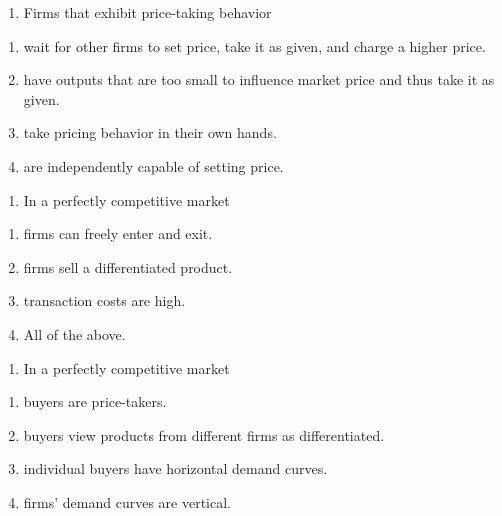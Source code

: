 \documentclass[11pt,]{article}
\providecommand{\tightlist}{%
  \setlength{\itemsep}{0pt}\setlength{\parskip}{0pt}}
\begin{document}
\begin{enumerate}
\def\labelenumi{\arabic{enumi})}
\setcounter{enumi}{11}
\tightlist
\item
  Firms that exhibit price-taking behavior
\end{enumerate}

\begin{enumerate}
\def\labelenumi{\Alph{enumi})}
\tightlist
\item
  wait for other firms to set price, take it as given, and charge a
  higher price.
\item
  have outputs that are too small to influence market price and thus
  take it as given.
\item
  take pricing behavior in their own hands.
\item
  are independently capable of setting price.
\end{enumerate}

\begin{enumerate}
\def\labelenumi{\arabic{enumi})}
\setcounter{enumi}{12}
\tightlist
\item
  In a perfectly competitive market
\end{enumerate}

\begin{enumerate}
\def\labelenumi{\Alph{enumi})}
\tightlist
\item
  firms can freely enter and exit.
\item
  firms sell a differentiated product.
\item
  transaction costs are high.
\item
  All of the above.
\end{enumerate}

\begin{enumerate}
\def\labelenumi{\arabic{enumi})}
\setcounter{enumi}{13}
\tightlist
\item
  In a perfectly competitive market
\end{enumerate}

\begin{enumerate}
\def\labelenumi{\Alph{enumi})}
\tightlist
\item
  buyers are price-takers.
\item
  buyers view products from different firms as differentiated.
\item
  individual buyers have horizontal demand curves.
\item
  firms' demand curves are vertical.
\end{enumerate}
\end{document}
